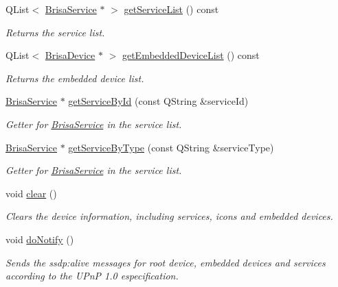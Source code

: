 \begin{DoxyCompactItemize}
QList$<$ \hyperlink{classBrisaUpnp_1_1BrisaService}{BrisaService} $\ast$ $>$ \hyperlink{classBrisaUpnp_1_1BrisaDevice_aa1b0d798eaca84dd4edfdc9c0a8957c4}{getServiceList} () const 
\begin{DoxyCompactList}\small\item\em Returns the service list. \item\end{DoxyCompactList}\item 
QList$<$ \hyperlink{classBrisaUpnp_1_1BrisaDevice}{BrisaDevice} $\ast$ $>$ \hyperlink{classBrisaUpnp_1_1BrisaDevice_aca3708629a0be61fd39d551213557a71}{getEmbeddedDeviceList} () const 
\begin{DoxyCompactList}\small\item\em Returns the embedded device list. \item\end{DoxyCompactList}\item 
\hyperlink{classBrisaUpnp_1_1BrisaService}{BrisaService} $\ast$ \hyperlink{classBrisaUpnp_1_1BrisaDevice_ac2684a19b15247b37c26854e54a18180}{getServiceById} (const QString \&serviceId)
\begin{DoxyCompactList}\small\item\em Getter for \hyperlink{classBrisaUpnp_1_1BrisaService}{BrisaService} in the service list. \item\end{DoxyCompactList}\item 
\hyperlink{classBrisaUpnp_1_1BrisaService}{BrisaService} $\ast$ \hyperlink{classBrisaUpnp_1_1BrisaDevice_a903a02e54f15ecdf85aa39235379855e}{getServiceByType} (const QString \&serviceType)
\begin{DoxyCompactList}\small\item\em Getter for \hyperlink{classBrisaUpnp_1_1BrisaService}{BrisaService} in the service list. \item\end{DoxyCompactList}\item 
void \hyperlink{classBrisaUpnp_1_1BrisaDevice_a0e44a74fcebe4ad71d5951f26f0925aa}{clear} ()
\begin{DoxyCompactList}\small\item\em Clears the device information, including services, icons and embedded devices. \item\end{DoxyCompactList}\item 
void \hyperlink{classBrisaUpnp_1_1BrisaDevice_ac0778c5cb3d7065e795f8dd08e79193b}{doNotify} ()
\begin{DoxyCompactList}\small\item\em Sends the ssdp:alive messages for root device, embedded devices and services according to the UPnP 1.0 especification. \item\end{DoxyCompactList}\item 

\end{DoxyCompactItemize}
